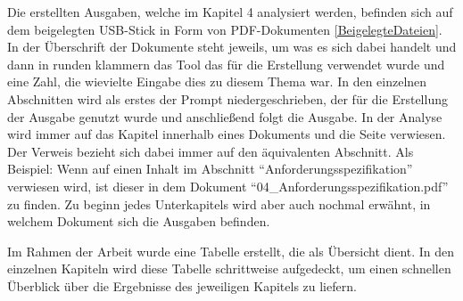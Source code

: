 Die erstellten Ausgaben, welche im Kapitel 4 analysiert werden, befinden sich auf dem beigelegten USB-Stick 
in Form von PDF-Dokumenten \autoref{BeigelegteDateien}. In der Überschrift der Dokumente steht jeweils, 
um was es sich dabei handelt und dann in runden klammern das Tool das für die Erstellung verwendet 
wurde und eine Zahl, die wievielte Eingabe dies zu diesem Thema war. In den einzelnen Abschnitten wird als erstes der 
Prompt niedergeschrieben, der für die Erstellung der Ausgabe genutzt wurde und anschließend folgt die Ausgabe. In der Analyse wird immer auf 
das Kapitel innerhalb eines Dokuments und die Seite verwiesen. Der Verweis bezieht sich dabei immer auf 
den äquivalenten Abschnitt. Als Beispiel: Wenn auf einen Inhalt im Abschnitt ``Anforderungsspezifikation'' verwiesen wird, 
ist dieser in dem Dokument ``04\_Anforderungsspezifikation.pdf'' zu finden. Zu beginn jedes Unterkapitels wird aber auch nochmal 
erwähnt, in welchem Dokument sich die Ausgaben befinden.

Im Rahmen der Arbeit wurde eine Tabelle erstellt, die als Übersicht dient. In den einzelnen Kapiteln wird diese Tabelle 
schrittweise aufgedeckt, um einen schnellen Überblick über die Ergebnisse des jeweiligen Kapitels zu liefern.